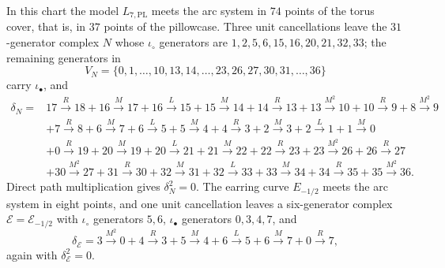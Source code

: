 In this chart the model $L_{7,\mathrm{PL}}$ meets the arc system in $74$ points of the torus cover, that is, in
$37$ points of the pillowcase.  Three unit cancellations leave the $31$-generator complex $N$ whose
$\iota_\circ$ generators are $1,2,5,6,15,16,20,21,32,33$; the remaining generators in
\[
 V_N=\{0,1,\dots,10,13,14,\dots,23,26,27,30,31,\dots,36\}
\]
carry $\iota_\bullet$, and
\begin{align*}
\delta_N={}&
17\xrightarrow R18+16\xrightarrow M17+16\xrightarrow L15
+15\xrightarrow M14+14\xrightarrow R13+13\xrightarrow{M^2}10
+10\xrightarrow R9+8\xrightarrow{M^2}9\\
&+7\xrightarrow R8+6\xrightarrow M7+6\xrightarrow L5+5\xrightarrow M4+4\xrightarrow R3
+2\xrightarrow M3+2\xrightarrow L1+1\xrightarrow M0\\
&+0\xrightarrow R19+20\xrightarrow M19+20\xrightarrow L21+21\xrightarrow M22
+22\xrightarrow R23+23\xrightarrow{M^2}26+26\xrightarrow R27\\
&+30\xrightarrow{M^2}27+31\xrightarrow R30+32\xrightarrow M31
+32\xrightarrow L33+33\xrightarrow M34+34\xrightarrow R35+35\xrightarrow{M^2}36.
\end{align*}
Direct path multiplication gives $\delta_N^2=0$.  The earring curve $E_{-1/2}$ meets the arc system in eight
points, and one unit cancellation leaves a six-generator complex $\mathcal E=\mathcal E_{-1/2}$ with $\iota_\circ$
generators $5,6$, $\iota_\bullet$ generators $0,3,4,7$, and
\begin{equation}\label{eq:red-typeD}
 \delta_{\mathcal E}=3\xrightarrow{M^2}0+4\xrightarrow R3+5\xrightarrow M4
 +6\xrightarrow L5+6\xrightarrow M7+0\xrightarrow R7 ,
\end{equation}
again with $\delta_{\mathcal E}^2=0$.

